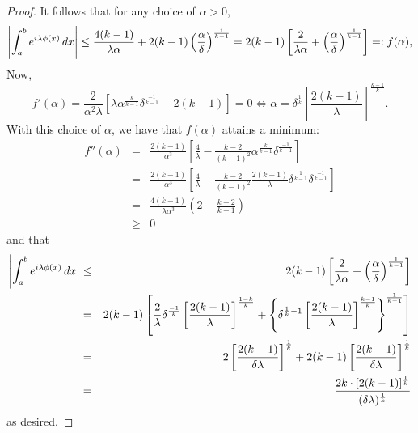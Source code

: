 \documentclass[11pt, letter]{book}
\newcommand{\lp}{\left(}
\newcommand{\rp}{\right)}
\newcommand{\lb}{\left[}
\newcommand{\rb}{\right]}
\newcommand{\lc}{\left\{}
\newcommand{\rc}{\right\}}
\newcommand{\f}[2]{\frac{#1}{#2}}
\newcommand{\al}{\alpha}
\begin{document}
\begin{proof}
It follows that for any choice of $\al > 0$,
\begin{equation*}
    \abs{\int_a^b e^{i\lambda \phi(x)} \,dx}  \leq \f{4(k-1)}{\lambda\alpha} + 2(k-1)\lp\f{\al}{\delta}\rp^{\f{1}{k-1}} = 2(k-1)\lb \f{2}{\lambda \alpha} +\lp  \f{\al}{\delta}\rp^{\f{1}{k-1}}   \rb =: f(\alpha),
\end{equation*}
Now, 
\begin{equation*}
    f'(\alpha) = \frac{2 }{\alpha ^2 \lambda }\left[
    \lambda \alpha^{\f{k}{k-1}} \delta^{\f{-1}{k-1}}
    -2(k-1)\right] =  0 \iff \al = \delta^{\f{1}{k}} \lb \f{2(k-1)}{\lambda} \rb^{\f{k-1}{k}} .
\end{equation*}
With this choice of $\al$, we have that $f(\al)$ attains a minimum:
\begin{eqnarray*}
    f''(\al) 
    &=&  \frac{2 (k-1)
   }{\alpha ^3} \left[\frac{4}{\lambda
   }-\frac{ k-2}{(
   k-1)^2} \alpha^{\f{k}{k-1}} \delta^{\frac{-1}{k-1}} \right]\\
   &=& \frac{2 (k-1)
   }{\alpha ^3} \left[\frac{4}{\lambda
   }-\frac{ k-2}{(
   k-1)^2}  \f{2(k-1)}{\lambda} \delta^{\f{1}{k-1}} \delta^{\frac{-1}{k-1}} \right]\\
   &=& \frac{4 (k-1)
   }{\lambda\alpha ^3} \left(2-\frac{ k-2}{
   k-1}  \right)\\
   &\geq& 0
\end{eqnarray*}
and that
\begin{eqnarray*}
    \abs{\int_a^b e^{i\lambda \phi(x)} \,dx}  
    &\leq& 2(k-1)\lb \f{2}{\lambda \alpha} +\lp  \f{\al}{\delta}\rp^{\f{1}{k-1}}   \rb\\
    &=&  2(k-1)\lb \f{2}{\lambda}\delta^{\f{-1}{k}}\lb \f{2(k-1)}{\lambda} \rb^{\f{1-k}{k}} +  \lc \delta^{\f{1}{k}-1} \lb \f{2(k-1)}{\lambda} \rb^{\f{k-1}{k}} \rc^{\f{1}{k-1}}\rb \\
    &=& 2\lb \f{2(k-1)}{\delta\lambda} \rb^{\f{1}{k}} + 2(k-1)\lb \f{2(k-1)}{\delta\lambda}\rb^{\f{1}{k}} \\
    &=& \f{2k\cdot [2(k-1)]^{\f{1}{k}}}{(\delta\lambda)^{\f{1}{k}}}
\end{eqnarray*}
as desired. 
\end{proof}
\end{document}
